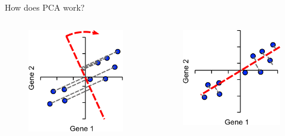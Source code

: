 \begin{frame}[allowframebreaks]{How does PCA work?}
\begin{columns}
\begin{column}{0.33\textwidth}
\begin{figure}
            \includegraphics[width=1\textwidth,keepaspectratio]{images/dul/dim-reduce/line-fit-rotate.png}
        \end{figure}
    \end{column}
    \begin{column}{0.33\textwidth}
        \begin{figure}
            \centering
            \includegraphics[width=1\textwidth,keepaspectratio]{images/dul/dim-reduce/line-fit-best.png}
        \end{figure}
    \end{column}
    \end{columns}
\end{frame}

